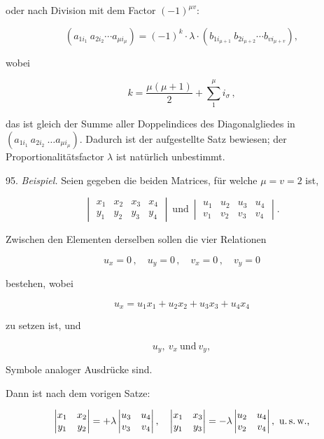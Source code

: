 \documentclass[11pt]{article}
\providecommand{\weq}[2]{\begin{equation}\tag{#1}#2\end{equation}}
\begin{document}
oder nach Division mit dem Factor $(-1)^{\mu v}$:

\weq{7}{(a_{1i_1}\ a_{2i_2} \cdots a_{\mu i_\mu}) = (-1)^k\cdot\lambda\cdot(b_{1i_{\mu+1}}\ b_{2i_{\mu+2}} \cdots b_{vi_{\mu+v}}),}

wobei

\[
k = \frac{\mu(\mu+1)}{2} + \sum_{1}^{\mu} i_\sigma\,,
\]

das ist gleich der Summe aller Doppelindices des Diagonalgliedes in $(a_{1i_1}\ a_{2i_2}\ \ldots a_{\mu i_\mu})$. Dadurch ist der aufgestellte Satz bewiesen; der Proportionalit\"atsfactor $\lambda$ ist nat\"urlich unbestimmt.

95. \textit{Beispiel.} Seien gegeben die beiden Matrices, f\"ur welche $\mu = v = 2$ ist,

\[
\begin{vmatrix}
x_1 & x_2 & x_3 & x_4 \\
y_1 & y_2 & y_3 & y_4
\end{vmatrix}
\ \text{und}\
\begin{vmatrix}
u_1 & u_2 & u_3 & u_4 \\
v_1 & v_2 & v_3 & v_4
\end{vmatrix}.
\]

Zwischen den Elementen derselben sollen die vier Relationen

\[
u_x = 0\,,\quad u_y = 0\,,\quad v_x = 0\,,\quad v_y = 0
\]

bestehen, wobei

\[
u_x = u_1 x_1 + u_2 x_2 + u_3 x_3 + u_4 x_4
\]

zu setzen ist, und

\[
u_y,\ v_x\ \text{und}\ v_y,
\]

Symbole analoger Ausdr\"ucke sind.

Dann ist nach dem vorigen Satze:

\[
\begin{vmatrix}
x_1 & x_2 \\
y_1 & y_2
\end{vmatrix}
= +\lambda
\begin{vmatrix}
u_3 & u_4 \\
v_3 & v_4
\end{vmatrix},\quad
\begin{vmatrix}
x_1 & x_3 \\
y_1 & y_3
\end{vmatrix}
= -\lambda
\begin{vmatrix}
u_2 & u_4 \\
v_2 & v_4
\end{vmatrix},\ \text{u.\,s.\,w.,}
\]
\end{document}
